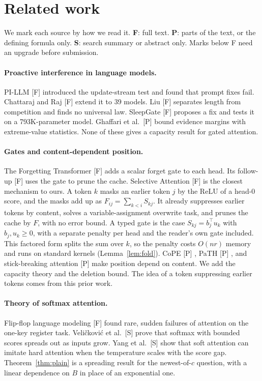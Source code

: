 \documentclass[10pt]{article}
\theoremstyle{definition}
\theoremstyle{remark}
\begin{document}
\section{Related work}\label{sec:related}

We mark each source by how we read it. \textbf{F}: full text. \textbf{P}: parts of the text, or the defining formula only. \textbf{S}: search summary or abstract only. Marks below F need an upgrade before submission.

\paragraph{Proactive interference in language models.} PI-LLM [F] \cite{pillm} introduced the update-stream test and found that prompt fixes fail. Chattaraj and Raj [F] \cite{rememberfirst} extend it to 39 models. Liu [F] \cite{lengthcheap} separates length from competition and finds no universal law. SleepGate [F] \cite{sleepgate} proposes a fix and tests it on a 793K-parameter model. Ghaffari et al.\ [P] \cite{poisoning} bound evidence margins with extreme-value statistics. None of these gives a capacity result for gated attention.

\paragraph{Gates and content-dependent position.} The Forgetting Transformer [F] \cite{fox} adds a scalar forget gate to each head. Its follow-up [F] \cite{acp} uses the gate to prune the cache. Selective Attention [F] \cite{selective} is the closest mechanism to ours. A token $k$ masks an earlier token $j$ by the $\mathrm{ReLU}$ of a head-0 score, and the masks add up as $F_{ij} = \sum_{k < i} S_{kj}$. It already suppresses earlier tokens by content, solves a variable-assignment overwrite task, and prunes the cache by $F$, with no error bound. A typed gate is the case $S_{kj} = b_j^\top u_k$ with $b_j, u_k \ge 0$, with a separate penalty per head and the reader's own gate included. This factored form splits the sum over $k$, so the penalty costs $O(nr)$ memory and runs on standard kernels (Lemma~\ref{lem:fold}). CoPE [P] \cite{cope}, PaTH [P] \cite{path}, and stick-breaking attention [P] \cite{stickbreaking} make position depend on content. We add the capacity theory and the deletion bound. The idea of a token suppressing earlier tokens comes from this prior work.

\paragraph{Theory of softmax attention.} Flip-flop language modeling [F] \cite{flipflop} found rare, sudden failures of attention on the one-key register task. Veli\v{c}kovi\'c et al.\ [S] \cite{softmaxnotenough} prove that softmax with bounded scores spreads out as inputs grow. Yang et al.\ [S] \cite{hardsoft} show that soft attention can imitate hard attention when the temperature scales with the score gap. Theorem~\ref{thm:plain} is a spreading result for the newest-of-$c$ question, with a linear dependence on $B$ in place of an exponential one.
\end{document}
